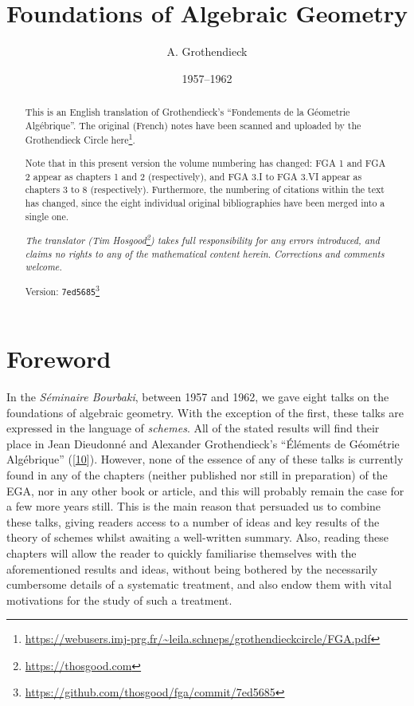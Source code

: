\documentclass{article}
\title{Foundations of Algebraic Geometry}
\author{A. Grothendieck}
\date{1957--1962}
\renewcommand{\href}[2]{#2\footnote{\url{#1}}}
\newcommand{\oldpage}[1]{\marginpar{\footnotesize$\Big\vert$ \textit{p.~#1}}}
\theoremstyle{definition}
\theoremstyle{definition}
\theoremstyle{definition}
\theoremstyle{definition}
\theoremstyle{remark}
\begin{document}
\maketitle
\thispagestyle{fancy}

\renewcommand{\abstractname}{Translator's note}

\setcounter{footnote}{0}

\tableofcontents



\leavevmode{}%
\begin{abstract}
This is an English translation of Grothendieck's ``Fondements de la Géometrie Algébrique''.
The original (French) notes have been scanned and uploaded by the Grothendieck Circle \href{https://webusers.imj-prg.fr/~leila.schneps/grothendieckcircle/FGA.pdf}{here}.

Note that in this present version the volume numbering has changed: FGA 1 and FGA 2 appear as chapters 1 and 2 (respectively), and FGA 3.I to FGA 3.VI appear as chapters 3 to 8 (respectively).
Furthermore, the numbering of citations within the text has changed, since the eight individual original bibliographies have been merged into a single one.

\emph{The translator (\href{https://thosgood.com}{Tim Hosgood}) takes full responsibility for any errors introduced, and claims no rights to any of the mathematical content herein.}
\emph{Corrections and comments welcome.}

Version: \href{https://github.com/thosgood/fga/commit/7ed5685}{\texttt{7ed5685}}

\end{abstract}

\hypertarget{foreword}{%
\section*{Foreword}\label{foreword}}

\oldpage{C-01}

In the \emph{Séminaire Bourbaki}, between 1957 and 1962, we gave eight talks on the foundations of algebraic geometry.
With the exception of the first, these talks are expressed in the language of \emph{schemes}.
All of the stated results will find their place in Jean Dieudonné and Alexander Grothendieck's ``Éléments de Géométrie Algébrique'' ({[}\protect\hyperlink{ref-GD1960}{10}{]}).
However, none of the essence of any of these talks is currently found in any of the chapters (neither published nor still in preparation) of the EGA, nor in any other book or article, and this will probably remain the case for a few more years still.
This is the main reason that persuaded us to combine these talks, giving readers access to a number of ideas and key results of the theory of schemes whilst awaiting a well-written summary.
Also, reading these chapters will allow the reader to quickly familiarise themselves with the aforementioned results and ideas, without being bothered by the necessarily cumbersome details of a systematic treatment, and also endow them with vital motivations for the study of such a treatment.
\end{document}
